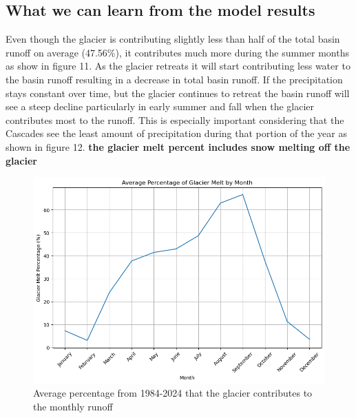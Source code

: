 \documentclass{article}
\begin{document}
\subsection{What we can learn from the model results}
Even though the glacier is contributing slightly less than half of the total basin runoff on average (47.56\%), it contributes much more during the summer 
months as show in figure 11. As the glacier retreats it will start contributing less water to the basin runoff resulting in a decrease in total 
basin runoff. If the precipitation stays constant over time, but the glacier continues to retreat the basin runoff will see a steep decline 
particularly in early summer and fall when the glacier contributes most to the runoff. This is especially important considering that the 
Cascades see the least amount of precipitation during that portion of the year as shown in figure 12.
\textbf{the glacier melt percent includes snow melting off the glacier}
\begin{figure}[h]
    \centering
    \includegraphics[width=\textwidth]{Plots/percent_glac_melt_month.png}
    \caption{Average percentage from 1984-2024 that the glacier contributes to the monthly runoff}
    \label{fig:percent_glacier_runoff}
\end{figure}
\FloatBarrier\
\end{document}
